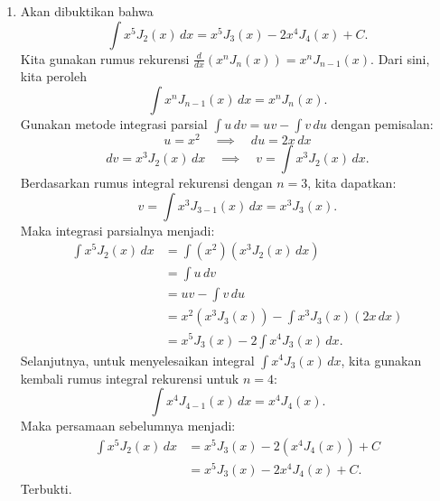\documentclass[12pt,openany,a4paper]{article}
\begin{document}
\begin{enumerate}
  \item Akan dibuktikan bahwa
        \[\int x^5 J_2(x) \, dx = x^5 J_3(x) - 2x^4 J_4(x) + C.\]
        Kita gunakan rumus rekurensi $\frac{d}{dx} (x^n J_n(x)) = x^n J_{n-1}(x)$. Dari sini, kita peroleh
        \[\int x^n J_{n-1}(x) \, dx = x^n J_n(x).\]
        Gunakan metode integrasi parsial $\int u \, dv = uv - \int v \, du$ dengan pemisalan:
        \[u = x^2 \quad \implies \quad du = 2x \, dx\]
        \[dv = x^3 J_2(x) \, dx \quad \implies \quad v = \int x^3 J_2(x) \, dx.\]
        Berdasarkan rumus integral rekurensi dengan $n=3$, kita dapatkan:
        \[v = \int x^3 J_{3-1}(x) \, dx = x^3 J_3(x).\]
        Maka integrasi parsialnya menjadi:
        \begin{align*}
          \int x^5 J_2(x) \, dx & = \int (x^2) \left( x^3 J_2(x) \, dx \right)                 \\
                                & = \int u \, dv                                               \\
                                & = uv - \int v \, du                                          \\
                                & = x^2 \left( x^3 J_3(x) \right) - \int x^3 J_3(x) (2x \, dx) \\
                                & = x^5 J_3(x) - 2 \int x^4 J_3(x) \, dx.
        \end{align*}
        Selanjutnya, untuk menyelesaikan integral $\int x^4 J_3(x) \, dx$, kita gunakan kembali rumus integral rekurensi untuk $n=4$:
        \[\int x^4 J_{4-1}(x) \, dx = x^4 J_4(x).\]
        Maka persamaan sebelumnya menjadi:
        \begin{align*}
          \int x^5 J_2(x) \, dx & = x^5 J_3(x) - 2 \left( x^4 J_4(x) \right) + C \\
                                & = x^5 J_3(x) - 2x^4 J_4(x) + C.
        \end{align*}
        Terbukti.
\end{enumerate}
\end{document}
